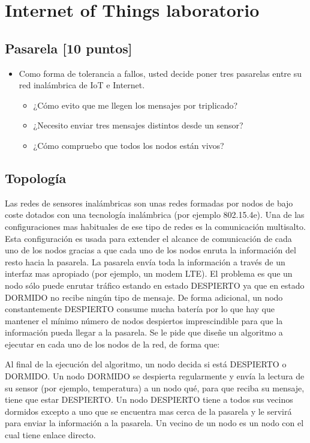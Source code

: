 \chapter{Internet of Things laboratorio}

\section{Pasarela [10 puntos]}
\begin{itemize}
\item Como forma de tolerancia a fallos, usted decide poner tres pasarelas entre su red inalámbrica de IoT e Internet.
  \begin{itemize}
  \item ¿Cómo evito que me llegen los mensajes por triplicado?
  \item ¿Necesito enviar tres mensajes distintos desde un sensor?
  \item ¿Cómo compruebo que todos los nodos están vivos?
  \end{itemize}
\end{itemize}



\section{Topología}
Las redes de sensores inalámbricas son unas redes formadas por nodos de bajo coste dotados con una tecnología inalámbrica (por ejemplo 802.15.4e). Una de las configuraciones mas habituales de ese tipo de redes es la comunicación multisalto. Esta configuración es usada para extender el alcance de comunicación de cada uno de los nodos gracias a que cada uno de los nodos enruta la información del resto hacia la pasarela. La pasarela envía toda la información a través de un interfaz mas apropiado (por ejemplo, un modem LTE). El problema es que un nodo sólo puede enrutar tráfico estando en estado DESPIERTO ya que en estado DORMIDO no recibe ningún tipo de mensaje. De forma adicional, un nodo constantemente DESPIERTO consume mucha batería por lo que hay que mantener el mínimo número de nodos despiertos imprescindible para que la información pueda llegar a la pasarela. Se le pide que diseñe un algoritmo a ejecutar en cada uno de los nodos de la red, de forma que:

Al final de la ejecución del algoritmo, un nodo decida si está DESPIERTO o DORMIDO.
Un nodo DORMIDO se despierta regularmente y envía la lectura de su sensor (por ejemplo, temperatura) a un nodo qué, para que reciba su mensaje, tiene que estar  DESPIERTO.
Un nodo DESPIERTO tiene a todos sus vecinos dormidos excepto a uno que se encuentra mas cerca de la pasarela y le servirá para enviar la información a la pasarela.  Un vecino de un nodo es un nodo con el cual tiene enlace directo. 

